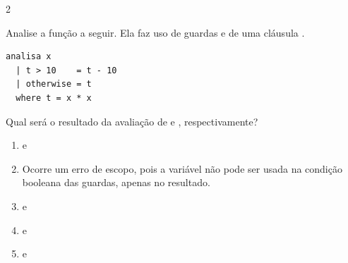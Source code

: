 \documentclass[a4paper,10pt,brazil]{article}
\begin{document}
\begin{multicols}{2}
\begin{enumerate}
\end{enumerate}

Analise a função a seguir. Ela faz uso de guardas e de uma cláusula .

\begin{verbatim}
analisa x
  | t > 10    = t - 10
  | otherwise = t
  where t = x * x
\end{verbatim}

Qual será o resultado da avaliação de  e , respectivamente?

\begin{enumerate}
  \item {} e 

  \item Ocorre um erro de escopo, pois a variável  não pode ser usada na condição booleana das guardas, apenas no resultado.

  \item {} e 

  \item {} e 

  \item {} e 


\end{enumerate}


\end{multicols}
\end{document}
